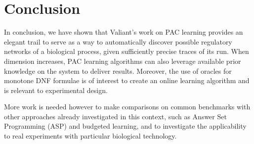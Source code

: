 \documentclass{llncs}
\begin{document}
\section{Conclusion}

In conclusion, we have shown that Valiant's work on PAC learning provides an elegant trail to serve as a way to automatically discover possible regulatory networks of a biological process, given sufficiently precise traces of its run.
When dimension increases, PAC learning algorithms can also leverage available prior knowledge on the system to deliver results.
Moreover, the use of oracles for monotone DNF formulae is of interest to create an online learning algorithm
and is relevant to experimental design.

More work is needed however to make comparisons on common benchmarks
with  other approaches already investigated in this context, such as Answer Set Programming (ASP) and budgeted learning,
and to investigate the applicability to real experiments with particular biological technology.



\end{document}

